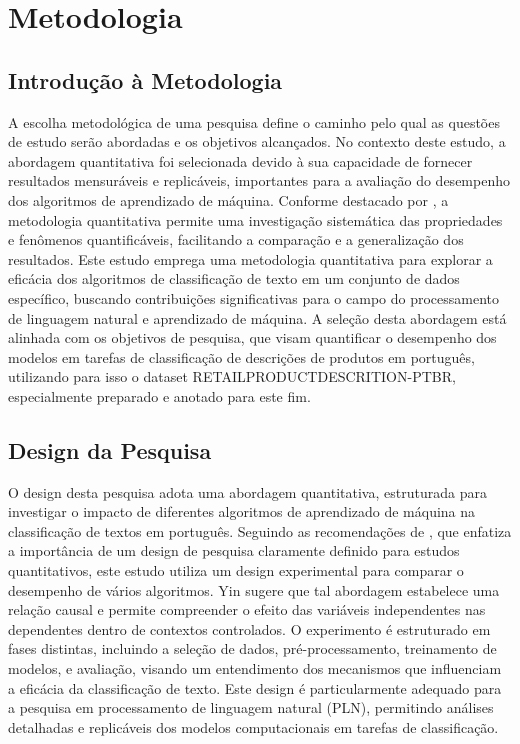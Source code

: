 \chapter{Metodologia}

\section{Introdução à Metodologia}

A escolha metodológica de uma pesquisa define o caminho pelo qual as questões de estudo serão abordadas e os objetivos alcançados. No contexto deste estudo, a abordagem quantitativa foi selecionada devido à sua capacidade de fornecer resultados mensuráveis e replicáveis, importantes para a avaliação do desempenho dos algoritmos de aprendizado de máquina. Conforme destacado por \cite{Creswell2014}, a metodologia quantitativa permite uma investigação sistemática das propriedades e fenômenos quantificáveis, facilitando a comparação e a generalização dos resultados. Este estudo emprega uma metodologia quantitativa para explorar a eficácia dos algoritmos de classificação de texto em um conjunto de dados específico, buscando contribuições significativas para o campo do processamento de linguagem natural e aprendizado de máquina. A seleção desta abordagem está alinhada com os objetivos de pesquisa, que visam quantificar o desempenho dos modelos em tarefas de classificação de descrições de produtos em português, utilizando para isso o dataset RETAILPRODUCTDESCRITION-PTBR, especialmente preparado e anotado para este fim.

\section{Design da Pesquisa}

O design desta pesquisa adota uma abordagem quantitativa, estruturada para investigar o impacto de diferentes algoritmos de aprendizado de máquina na classificação de textos em português. Seguindo as recomendações de \cite{Yin2018}, que enfatiza a importância de um design de pesquisa claramente definido para estudos quantitativos, este estudo utiliza um design experimental para comparar o desempenho de vários algoritmos. Yin sugere que tal abordagem estabelece uma relação causal e permite compreender o efeito das variáveis independentes nas dependentes dentro de contextos controlados. O experimento é estruturado em fases distintas, incluindo a seleção de dados, pré-processamento, treinamento de modelos, e avaliação, visando um entendimento dos mecanismos que influenciam a eficácia da classificação de texto. Este design é particularmente adequado para a pesquisa em processamento de linguagem natural (PLN), permitindo análises detalhadas e replicáveis dos modelos computacionais em tarefas de classificação.


